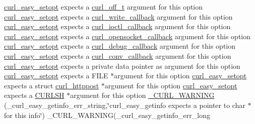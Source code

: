 \begin{DoxyCompactItemize}
\hyperlink{easy_8h_a7b171739b7bb728b3b58b2e6ec454aa0}{curl\+\_\+easy\+\_\+setopt} expects a \hyperlink{curlbuild_8h_a494e2b4279dc064f7ed1d0abd602b28d}{curl\+\_\+off\+\_\+t} argument for this option \hyperlink{easy_8h_a7b171739b7bb728b3b58b2e6ec454aa0}{curl\+\_\+easy\+\_\+setopt} expects a \hyperlink{curl_8h_ad65e62dcde45b356254b0f25f38dd802}{curl\+\_\+write\+\_\+callback} argument for this option \hyperlink{easy_8h_a7b171739b7bb728b3b58b2e6ec454aa0}{curl\+\_\+easy\+\_\+setopt} expects a \hyperlink{curl_8h_ae0524f6ec082005e39eb275c71c59a3b}{curl\+\_\+ioctl\+\_\+callback} argument for this option \hyperlink{easy_8h_a7b171739b7bb728b3b58b2e6ec454aa0}{curl\+\_\+easy\+\_\+setopt} expects a \hyperlink{curl_8h_a1b8b8f3e1a4e538a6bb1dd83a3388547}{curl\+\_\+opensocket\+\_\+callback} argument for this option \hyperlink{easy_8h_a7b171739b7bb728b3b58b2e6ec454aa0}{curl\+\_\+easy\+\_\+setopt} expects a \hyperlink{curl_8h_a50147c55283ee1fa3322b0d5aff2326c}{curl\+\_\+debug\+\_\+callback} argument for this option \hyperlink{easy_8h_a7b171739b7bb728b3b58b2e6ec454aa0}{curl\+\_\+easy\+\_\+setopt} expects a \hyperlink{curl_8h_acb230bf6dbf7bcb6e4e8740ea42ca3b3}{curl\+\_\+conv\+\_\+callback} argument for this option \hyperlink{easy_8h_a7b171739b7bb728b3b58b2e6ec454aa0}{curl\+\_\+easy\+\_\+setopt} expects a private data pointer as argument for this option \hyperlink{easy_8h_a7b171739b7bb728b3b58b2e6ec454aa0}{curl\+\_\+easy\+\_\+setopt} expects a F\+I\+LE $\ast$argument for this option \hyperlink{easy_8h_a7b171739b7bb728b3b58b2e6ec454aa0}{curl\+\_\+easy\+\_\+setopt} expects a struct \hyperlink{structcurl__httppost}{curl\+\_\+httppost} $\ast$argument for this option \hyperlink{easy_8h_a7b171739b7bb728b3b58b2e6ec454aa0}{curl\+\_\+easy\+\_\+setopt} expects a \hyperlink{curl_8h_a746d4e7ba89fe28a008e91cffb343ef0}{C\+U\+R\+L\+SH} $\ast$argument for this option \hyperlink{typecheck-gcc_8h_a52cfaffda1358b4ef703c9e692228170}{\+\_\+\+C\+U\+R\+L\+\_\+\+W\+A\+R\+N\+I\+NG} (\+\_\+curl\+\_\+easy\+\_\+getinfo\+\_\+err\+\_\+string,\char`\"{}curl\+\_\+easy\+\_\+getinfo expects a pointer to char $\ast$ for this info\char`\"{}) \+\_\+\+C\+U\+R\+L\+\_\+\+W\+A\+R\+N\+I\+NG(\+\_\+curl\+\_\+easy\+\_\+getinfo\+\_\+err\+\_\+long
\item 

\end{DoxyCompactItemize}
